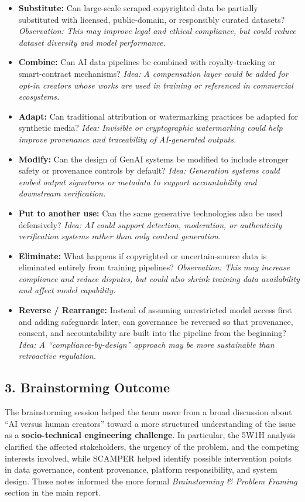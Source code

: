 \begin{itemize}
    \item \textbf{Substitute:} Can large-scale scraped copyrighted data be partially substituted with licensed, public-domain, or responsibly curated datasets? \textit{Observation: This may improve legal and ethical compliance, but could reduce dataset diversity and model performance.}

    \item \textbf{Combine:} Can AI data pipelines be combined with royalty-tracking or smart-contract mechanisms? \textit{Idea: A compensation layer could be added for opt-in creators whose works are used in training or referenced in commercial ecosystems.}

    \item \textbf{Adapt:} Can traditional attribution or watermarking practices be adapted for synthetic media? \textit{Idea: Invisible or cryptographic watermarking could help improve provenance and traceability of AI-generated outputs.}

    \item \textbf{Modify:} Can the design of GenAI systems be modified to include stronger safety or provenance controls by default? \textit{Idea: Generation systems could embed output signatures or metadata to support accountability and downstream verification.}

    \item \textbf{Put to another use:} Can the same generative technologies also be used defensively? \textit{Idea: AI could support detection, moderation, or authenticity verification systems rather than only content generation.}

    \item \textbf{Eliminate:} What happens if copyrighted or uncertain-source data is eliminated entirely from training pipelines? \textit{Observation: This may increase compliance and reduce disputes, but could also shrink training data availability and affect model capability.}

    \item \textbf{Reverse / Rearrange:} Instead of assuming unrestricted model access first and adding safeguards later, can governance be reversed so that provenance, consent, and accountability are built into the pipeline from the beginning? \textit{Idea: A “compliance-by-design” approach may be more sustainable than retroactive regulation.}
\end{itemize}

\subsection*{3. Brainstorming Outcome}
The brainstorming session helped the team move from a broad discussion about ``AI versus human creators'' toward a more structured understanding of the issue as a \textbf{socio-technical engineering challenge}. In particular, the 5W1H analysis clarified the affected stakeholders, the urgency of the problem, and the competing interests involved, while SCAMPER helped identify possible intervention points in data governance, content provenance, platform responsibility, and system design. These notes informed the more formal \textit{Brainstorming \& Problem Framing} section in the main report.
